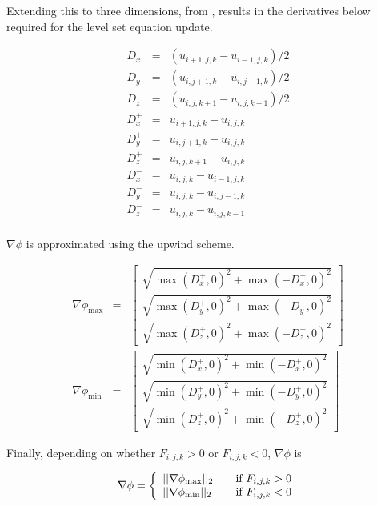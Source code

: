 Extending this to three dimensions, from \cite{Lefohn04astreaming}, results in the derivatives below required for the level set equation update. 

\begin{eqnarray}
	D_x &=& (u_{i+1,j,k}-u_{i-1,j,k})/2 \nonumber\\
	D_y &=& (u_{i,j+1,k}-u_{i,j-1,k})/2 \nonumber\\
	D_z &=& (u_{i,j,k+1}-u_{i,j,k-1})/2 \nonumber\\
	D_x^+ &=& u_{i+1,j,k}-u_{i,j,k} \nonumber\\
	D_y^+ &=& u_{i,j+1,k}-u_{i,j,k} \nonumber\\
	D_z^+ &=& u_{i,j,k+1}-u_{i,j,k} \nonumber\\
	D_x^- &=& u_{i,j,k}-u_{i-1,j,k} \nonumber\\
	D_y^- &=& u_{i,j,k}-u_{i,j-1,k} \nonumber\\
	D_z^- &=& u_{i,j,k}-u_{i,j,k-1} \nonumber\\
\end{eqnarray}

$\nabla\phi$ is approximated using the upwind scheme.

\begin{eqnarray}
\nabla\phi_{\max} &=& \left[
  \begin{array}{ c }
     \sqrt{\max(D_x^+, 0)^2 + \max(-D_x^+,0)^2}  \\[2em]
     \sqrt{\max(D_y^+, 0)^2 + \max(-D_y^+,0)^2}  \\[2em]
     \sqrt{\max(D_z^+, 0)^2 + \max(-D_z^+,0)^2}  
  \end{array} \right] \\[2em]
\nabla\phi_{\min} &=& \left[
  \begin{array}{ c }
     \sqrt{\min(D_x^+, 0)^2 + \min(-D_x^+,0)^2}  \\[2em]
     \sqrt{\min(D_y^+, 0)^2 + \min(-D_y^+,0)^2}  \\[2em]
     \sqrt{\min(D_z^+, 0)^2 + \min(-D_z^+,0)^2} 
  \end{array} \right] 
\end{eqnarray}

Finally, depending on whether $F_{i,j,k} > 0$ or $F_{i,j,k} < 0$, $\nabla\phi$ is 

\begin{equation}
\nabla\phi = \left\{ 
\begin{array}{l l}
  ||\nabla\phi_{\max}||_2 & \quad \mbox{if $F_{i,j,k} > 0$}\\
  ||\nabla\phi_{\min}||_2 & \quad \mbox{if $F_{i,j,k} < 0$}\\ \end{array} \right.
\label{eq:finalchoice}
\end{equation}

